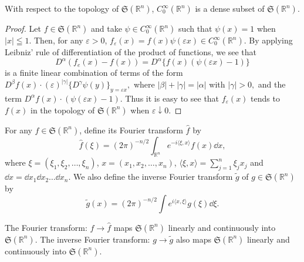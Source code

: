 \begin{proposition}\label{prop:VI.1.Proposition.3} With respect to the topology of $\mathfrak{S}(\mathbb{R}^{n})$, $C_0^\infty (\mathbb{R}^{n})$ is a dense subset of $\mathfrak{S}(\mathbb{R}^{n})$. 
\end{proposition}

\begin{proof}
 Let $f \in \mathfrak{S}(\mathbb{R}^{n})$ and take $\psi \in C_0^\infty(\mathbb{R}^{n})$ such that $\psi(x) = 1$ when $|x| \leqq 1$. Then, for any $\varepsilon > 0$, $f_{\varepsilon}(x) = f(x) \psi(\varepsilon x) \in C_0^\infty(\mathbb{R}^{n})$. By applying Leibniz' rule of differentiation of the product of functions, we see that 
\[
D ^{\alpha} (f _{e} (x) - f (x)) = D ^{\alpha} \{f (x) (\psi (\varepsilon x) - 1) \}
\]
is a finite linear combination of terms of the form 
$D^{\beta}f(x)\cdot (\varepsilon)^{|\gamma |}\{D^{\gamma}\psi (y)\}_{y = \varepsilon x},$ where $|\beta | + |\gamma | = |\alpha |$ with $|\gamma | > 0,$ 
and the term $D^{\alpha}f(x) \cdot (\psi(\varepsilon x) - 1)$. Thus it is easy to see that $f_{\varepsilon}(x)$ tends to $f(x)$ in the topology of $\mathfrak{S}(\mathbb{R}^{n})$ when $\varepsilon \downarrow 0$. 
\end{proof}

\begin{definition}\label{def:VI.1.Definition.2} For any $f \in \mathfrak{S}(\mathbb{R}^{n})$, define its Fourier transform $\hat{f}$ by 
\begin{equation}\label{eq:VI.1.3}
\hat {f} (\xi) = (2 \pi) ^{-n/2} \int_ {\mathbb{R}^{n}} e ^{- i \langle \xi , x \rangle} f (x) \dd x,
\end{equation}
where $\xi = (\xi_1, \xi_2, \ldots, \xi_n)$, $x = (x_1, x_2, \ldots, x_n)$, $\langle \xi, x \rangle = \sum\limits_{j=1}^{n} \xi_j x_j$ and $\dd x = \dd x_1 \dd x_2 \ldots \dd x_n$. We also define the inverse Fourier transform $\tilde{g}$ of $g \in \mathfrak{S}(\mathbb{R}^{n})$ by 
\begin{equation}\label{eq:VI.1.4}
\widetilde {g} (x) = (2 \pi) ^{-n/2} \int e ^{i \langle x, \xi \rangle} g (\xi) \dd \xi .
\end{equation}
\end{definition}

\begin{proposition}\label{prop:VI.1.Proposition.4} The Fourier transform: $f \to \hat{f}$ maps $\mathfrak{S}(\mathbb{R}^{n})$ linearly and continuously into $\mathfrak{S}(\mathbb{R}^{n})$. The inverse Fourier transform: $g \to \tilde{g}$ also maps $\mathfrak{S}(\mathbb{R}^{n})$ linearly and continuously into $\mathfrak{S}(\mathbb{R}^{n})$. 
\end{proposition}

